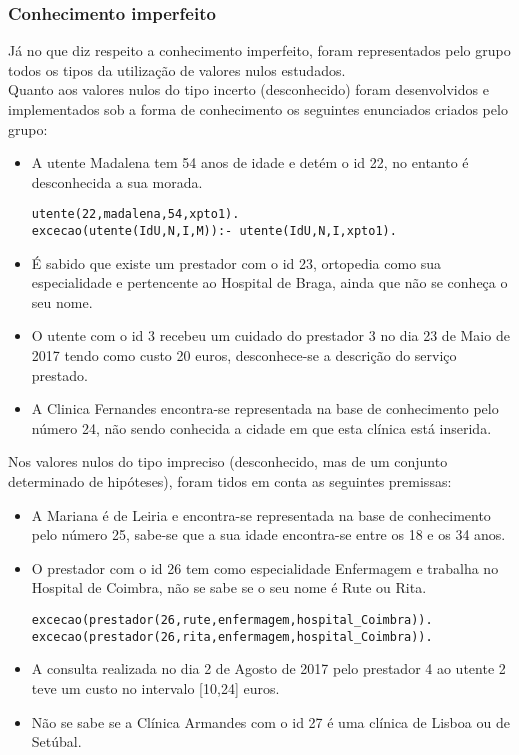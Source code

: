 \documentclass{article}
\begin{document}
\subsubsection{Conhecimento imperfeito}
Já no que diz respeito a conhecimento imperfeito, foram representados pelo grupo todos os tipos da utilização de valores nulos estudados.\\
Quanto aos valores nulos do tipo incerto (desconhecido) foram desenvolvidos e implementados sob a forma de conhecimento os seguintes enunciados criados pelo grupo:
\begin{itemize}
	\item A utente Madalena tem 54 anos de idade e detém o id 22, no entanto é desconhecida a sua morada.
\begin{verbatim}
utente(22,madalena,54,xpto1).
excecao(utente(IdU,N,I,M)):- utente(IdU,N,I,xpto1).
\end{verbatim}
    \item É sabido que existe um prestador com o id 23, ortopedia como sua especialidade e pertencente ao Hospital de Braga, ainda que não se conheça o seu nome.
    \item O utente com o id 3 recebeu um cuidado do prestador 3 no dia 23 de Maio de 2017 tendo como custo 20 euros, desconhece-se a descrição do serviço prestado. 
	\item A Clinica Fernandes encontra-se representada na base de conhecimento pelo número 24, não sendo conhecida a cidade em que esta clínica está inserida. 
\end{itemize}
Nos valores nulos do tipo impreciso (desconhecido, mas de um conjunto determinado de hipóteses), foram tidos em conta as seguintes premissas:
\begin{itemize}
	\item A Mariana é de Leiria e encontra-se representada na base de conhecimento pelo número 25, sabe-se que a sua idade encontra-se entre os 18 e os 34 anos.
    \item O prestador com o id 26 tem como especialidade Enfermagem e trabalha no Hospital de Coimbra, não se sabe se o seu nome é Rute ou Rita.
\begin{verbatim}
excecao(prestador(26,rute,enfermagem,hospital_Coimbra)).
excecao(prestador(26,rita,enfermagem,hospital_Coimbra)).
\end{verbatim}
    \item A consulta realizada no dia 2 de Agosto de 2017 pelo prestador 4 ao utente 2 teve um custo no intervalo [10,24] euros.
    \item Não se sabe se a Clínica Armandes com o id 27 é uma clínica de Lisboa ou de Setúbal.
\end{itemize}
\end{document}
